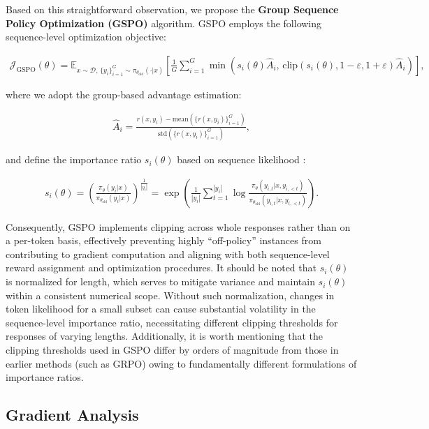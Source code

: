 Based on this straightforward observation, we propose the \textbf{Group Sequence Policy Optimization (GSPO)} algorithm. GSPO employs the following sequence-level optimization objective:

\begin{align}
\mathcal{J}_\text{GSPO} (\theta) =
\mathbb{E}_{ x \sim \mathcal{D},\, \{y_i\}_{i=1}^G \sim \pi_{\theta_\text{old}}( \cdot | x) }
\left[ 
\frac{1}{G} \sum_{i=1}^{G}
\min \left( s_{i}(\theta)  \widehat{A}_{i},  \, \mathrm{clip} \left( s_{i}(\theta), 1 - {\varepsilon}, 1 + {\varepsilon} \right) \widehat{A}_{i} \right) 
\right],
\label{equ:gspo}
\end{align}

where we adopt the group-based advantage estimation:

\begin{align}
\widehat{A}_{i} = \frac{r(x, y_i) - \mathrm{mean} \left( \{ r(x, y_i) \}_{i=1}^G \right) }{ \mathrm{std} \left( \{ r(x, y_i) \}_{i=1}^G \right) },
\end{align}

and define the importance ratio $s_{i}(\theta)$ based on sequence likelihood \citep{click}:

\begin{align}
s_{i}(\theta) = \left( \frac{ \pi_{\theta} (y_i | x) }{ \pi_{\theta_\text{old}} (y_i | x)} \right)^{\frac{1}{|y_i|}}
=
\exp \left( \frac{1}{|y_i|} \sum_{t=1}^{|y_i|} \log \frac{ \pi_{\theta} (y_{i,t} | x, y_{i,<t}) }{ \pi_{\theta_\text{old}} (y_{i,t} | x,y_{i,<t})} \right).
\end{align}

Consequently, GSPO implements clipping across whole responses rather than on a per-token basis, effectively preventing highly ``off-policy'' instances from contributing to gradient computation and aligning with both sequence-level reward assignment and optimization procedures. It should be noted that $s_{i}(\theta)$ is normalized for length, which serves to mitigate variance and maintain $s_{i}(\theta)$ within a consistent numerical scope. Without such normalization, changes in token likelihood for a small subset can cause substantial volatility in the sequence-level importance ratio, necessitating different clipping thresholds for responses of varying lengths. Additionally, it is worth mentioning that the clipping thresholds used in GSPO differ by orders of magnitude from those in earlier methods (such as GRPO) owing to fundamentally different formulations of importance ratios.

\subsection{Gradient Analysis}
\label{subsec:gradient}

